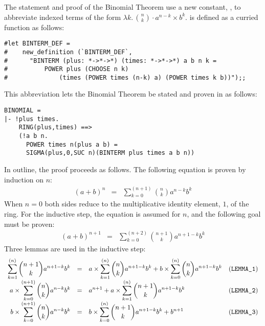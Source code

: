The statement and proof of the Binomial Theorem use a new \HOL{} constant,
\verb@BINTERM@, to abbreviate indexed terms of the form $\lambda k.\,{n
\choose k} \cdot a^{n-k} \times b^k$.  \verb@BINTERM@ is defined as a
curried function as follows:
\begin{session}
\begin{verbatim}
#let BINTERM_DEF =
#    new_definition (`BINTERM_DEF`,
#      "BINTERM (plus: *->*->*) (times: *->*->*) a b n k =
#          POWER plus (CHOOSE n k)
#              (times (POWER times (n-k) a) (POWER times k b))");;
\end{verbatim}
\end{session}
This abbreviation lets the Binomial Theorem be stated and proven in \HOL{} as
follows:
\begin{session}
\begin{verbatim}
BINOMIAL =
|- !plus times.
    RING(plus,times) ==>
    (!a b n.
      POWER times n(plus a b) =
      SIGMA(plus,0,SUC n)(BINTERM plus times a b n))
\end{verbatim}
\end{session}
In outline, the proof proceeds as follows.  The following equation is
proven by induction on $n$:
\begin{eqnarray*}
(a+b)^n &=& \sum_{k=0}^{(n+1)} {n \choose k} a^{n-k} b^k
\end{eqnarray*}
When $n=0$ both sides reduce to the multiplicative identity element, $1$,
of the ring. For the inductive step, the equation is assumed for $n$, and
the following goal must be proven:
\begin{eqnarray*}
(a+b)^{n+1} &=& \sum_{k=0}^{(n+2)} {{n+1} \choose k} a^{n+1-k} b^k
\end{eqnarray*}
Three lemmas are used in the inductive step:
\[\begin{array}{rcll}
\displaystyle
\sum_{k=1}^{(n)} {{n+1} \choose k} a^{n+1-k} b^k &=&
\displaystyle
    a \times \sum_{k=1}^{(n)} {n \choose k} a^{n+1-k} b^k +
    b \times \sum_{k=0}^{(n)} {n \choose k} a^{n+1-k} b^k
    & \mbox{({\tt LEMMA\_1})} \\
\displaystyle
a \times \sum_{k=0}^{(n+1)} {n \choose k} a^{n-k} b^k &=&
\displaystyle
    a^{n+1} +
    a \times \sum_{k=1}^{(n)} {{n+1} \choose k} a^{n+1-k} b^k
    & \mbox{({\tt LEMMA\_2})} \\
\displaystyle
b \times \sum_{k=0}^{(n+1)} {n \choose k} a^{n-k} b^k &=&
\displaystyle
    b \times \sum_{k=0}^{(n)} {{n+1} \choose k} a^{n+1-k} b^k
    + b^{n+1}
    & \mbox{({\tt LEMMA\_3})}
\end{array}\]

